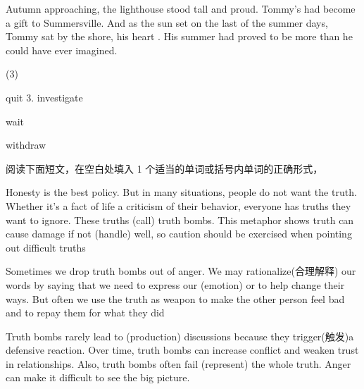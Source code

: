 \documentclass{英语试卷}
\begin{document}
\par Autumn approaching, the lighthouse stood tall and proud. Tommy's  had become a gift to Summersville. And as the sun set on the last of the summer days, Tommy sat by the shore, his heart . His summer had proved to be more  than he could have ever imagined.\par
{}
\begin{choices}(3)
  \item quit 3. investigate
  \item wait
  \item withdraw
\end{choices}
\par 阅读下面短文，在空白处填入 1 个适当的单词或括号内单词的正确形式，\par
\par Honesty is the best policy. But in many situations, people do not want the truth. Whether it's a fact of life  a criticism of their behavior, everyone has truths they want to ignore. These truths  (call) truth bombs. This metaphor shows truth can cause damage if not  (handle) well, so caution should be exercised when pointing out difficult truths\par
\par Sometimes we drop truth bombs out of anger. We may rationalize(合理解释) our words by saying that we need to express our  (emotion) or to help change their ways. But often we use the truth as  weapon to make the other person feel bad and to repay them for what they did\par
\par Truth bombs rarely lead to (production) discussions because they trigger(触发)a defensive reaction. Over time, truth bombs can increase conflict and weaken trust in relationships. Also, truth bombs often fail (represent) the whole truth. Anger can make it difficult to see the big picture.\par
\end{document}

